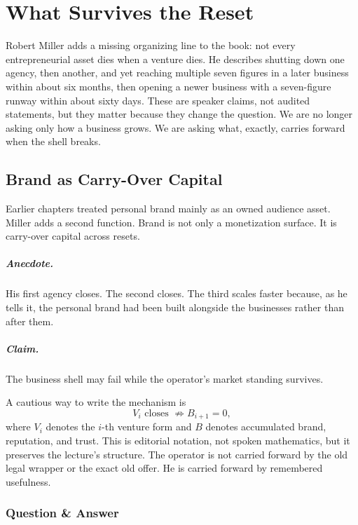 \documentclass[11pt,oneside]{book}
\begin{document}
\chapter{What Survives the Reset}

Robert Miller adds a missing organizing line to the book: not every entrepreneurial asset dies when a venture dies. He describes shutting down one agency, then another, and yet reaching multiple seven figures in a later business within about six months, then opening a newer business with a seven-figure runway within about sixty days. These are speaker claims, not audited statements, but they matter because they change the question. We are no longer asking only how a business grows. We are asking what, exactly, carries forward when the shell breaks.

\section{Brand as Carry-Over Capital}

Earlier chapters treated personal brand mainly as an owned audience asset. Miller adds a second function. Brand is not only a monetization surface. It is carry-over capital across resets.

\paragraph{Anecdote.}
His first agency closes. The second closes. The third scales faster because, as he tells it, the personal brand had been built alongside the businesses rather than after them.

\paragraph{Claim.}
The business shell may fail while the operator's market standing survives.

A cautious way to write the mechanism is
\[
V_i\text{ closes } \not\Rightarrow B_{i+1}=0,
\]
where \(V_i\) denotes the \(i\)-th venture form and \(B\) denotes accumulated brand, reputation, and trust. This is editorial notation, not spoken mathematics, but it preserves the lecture's structure. The operator is not carried forward by the old legal wrapper or the exact old offer. He is carried forward by remembered usefulness.

\subsection{Question \& Answer}
\end{document}
